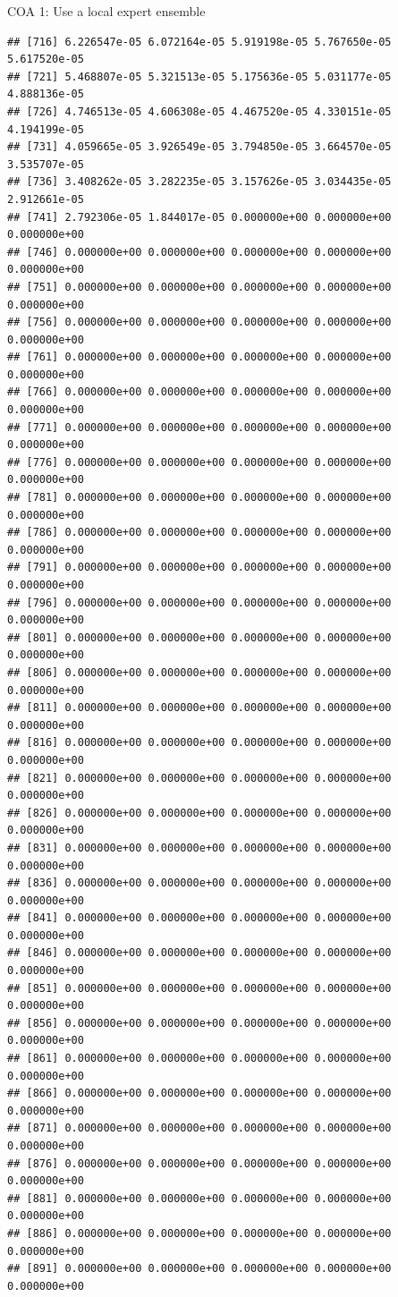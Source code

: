 \documentclass[ignorenonframetext,]{beamer}
\begin{document}
\begin{frame}[fragile]{COA 1: Use a local expert ensemble}
\begin{verbatim}
## [716] 6.226547e-05 6.072164e-05 5.919198e-05 5.767650e-05 5.617520e-05
## [721] 5.468807e-05 5.321513e-05 5.175636e-05 5.031177e-05 4.888136e-05
## [726] 4.746513e-05 4.606308e-05 4.467520e-05 4.330151e-05 4.194199e-05
## [731] 4.059665e-05 3.926549e-05 3.794850e-05 3.664570e-05 3.535707e-05
## [736] 3.408262e-05 3.282235e-05 3.157626e-05 3.034435e-05 2.912661e-05
## [741] 2.792306e-05 1.844017e-05 0.000000e+00 0.000000e+00 0.000000e+00
## [746] 0.000000e+00 0.000000e+00 0.000000e+00 0.000000e+00 0.000000e+00
## [751] 0.000000e+00 0.000000e+00 0.000000e+00 0.000000e+00 0.000000e+00
## [756] 0.000000e+00 0.000000e+00 0.000000e+00 0.000000e+00 0.000000e+00
## [761] 0.000000e+00 0.000000e+00 0.000000e+00 0.000000e+00 0.000000e+00
## [766] 0.000000e+00 0.000000e+00 0.000000e+00 0.000000e+00 0.000000e+00
## [771] 0.000000e+00 0.000000e+00 0.000000e+00 0.000000e+00 0.000000e+00
## [776] 0.000000e+00 0.000000e+00 0.000000e+00 0.000000e+00 0.000000e+00
## [781] 0.000000e+00 0.000000e+00 0.000000e+00 0.000000e+00 0.000000e+00
## [786] 0.000000e+00 0.000000e+00 0.000000e+00 0.000000e+00 0.000000e+00
## [791] 0.000000e+00 0.000000e+00 0.000000e+00 0.000000e+00 0.000000e+00
## [796] 0.000000e+00 0.000000e+00 0.000000e+00 0.000000e+00 0.000000e+00
## [801] 0.000000e+00 0.000000e+00 0.000000e+00 0.000000e+00 0.000000e+00
## [806] 0.000000e+00 0.000000e+00 0.000000e+00 0.000000e+00 0.000000e+00
## [811] 0.000000e+00 0.000000e+00 0.000000e+00 0.000000e+00 0.000000e+00
## [816] 0.000000e+00 0.000000e+00 0.000000e+00 0.000000e+00 0.000000e+00
## [821] 0.000000e+00 0.000000e+00 0.000000e+00 0.000000e+00 0.000000e+00
## [826] 0.000000e+00 0.000000e+00 0.000000e+00 0.000000e+00 0.000000e+00
## [831] 0.000000e+00 0.000000e+00 0.000000e+00 0.000000e+00 0.000000e+00
## [836] 0.000000e+00 0.000000e+00 0.000000e+00 0.000000e+00 0.000000e+00
## [841] 0.000000e+00 0.000000e+00 0.000000e+00 0.000000e+00 0.000000e+00
## [846] 0.000000e+00 0.000000e+00 0.000000e+00 0.000000e+00 0.000000e+00
## [851] 0.000000e+00 0.000000e+00 0.000000e+00 0.000000e+00 0.000000e+00
## [856] 0.000000e+00 0.000000e+00 0.000000e+00 0.000000e+00 0.000000e+00
## [861] 0.000000e+00 0.000000e+00 0.000000e+00 0.000000e+00 0.000000e+00
## [866] 0.000000e+00 0.000000e+00 0.000000e+00 0.000000e+00 0.000000e+00
## [871] 0.000000e+00 0.000000e+00 0.000000e+00 0.000000e+00 0.000000e+00
## [876] 0.000000e+00 0.000000e+00 0.000000e+00 0.000000e+00 0.000000e+00
## [881] 0.000000e+00 0.000000e+00 0.000000e+00 0.000000e+00 0.000000e+00
## [886] 0.000000e+00 0.000000e+00 0.000000e+00 0.000000e+00 0.000000e+00
## [891] 0.000000e+00 0.000000e+00 0.000000e+00 0.000000e+00 0.000000e+00

\end{verbatim}
\end{frame}
\end{document}
